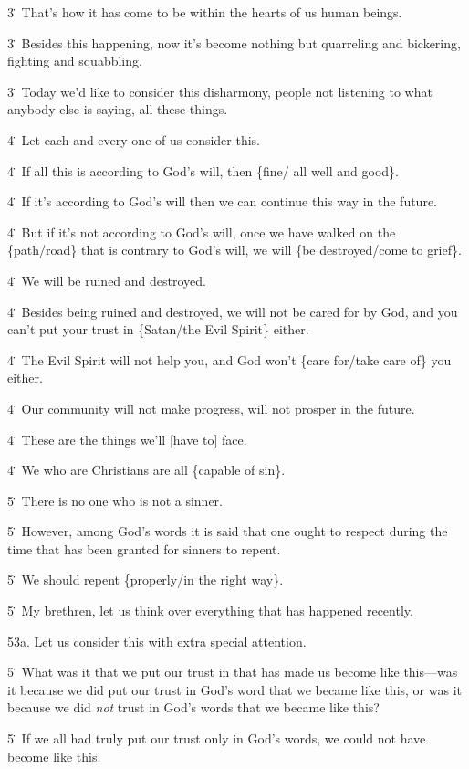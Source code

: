 3\. That's how it has come to be within the hearts of us human beings.

3\. Besides this happening, now it's become nothing but quarreling and bickering,
fighting and squabbling.

3\. Today we'd like to consider this disharmony, people not listening to what anybody
else is saying, all these things.

4\. Let each and every one of us consider this.

4\. If all this is according to God's will, then \{fine/ all well and good\}.

4\. If it's according to God's will then we can continue this way in the future.

4\. But if it's not according to God's will, once we have walked on the \{path/road\}
that is contrary to God's will, we will \{be destroyed/come to grief\}.

4\. We will be ruined and destroyed.

4\. Besides being ruined and destroyed, we will not be cared for by God, and you
can't put your trust in \{Satan/the Evil Spirit\} either.

4\. The Evil Spirit will not help you, and God won't \{care for/take care of\}
you either.

4\. Our community will not make progress, will not prosper in the future.

4\. These are the things we'll [have to] face.

4\. We who are Christians are all \{capable of sin\}.

5\. There is no one who is not a sinner.

5\. However, among God's words it is said that one ought to respect during the
time that has been granted for sinners to repent.

5\. We should repent \{properly/in the right way\}.

5\. My brethren, let us think over everything that has happened recently.

53a. Let us consider this with extra special attention.

5\. What was it that we put our trust in that has made us become like this---was
it because we did put our trust in God's word that we became like this, or was
it because we did \textit{not} trust in God's words that we became like this?

5\. If we all had truly put our trust only in God's words, we could not have become
like this.

